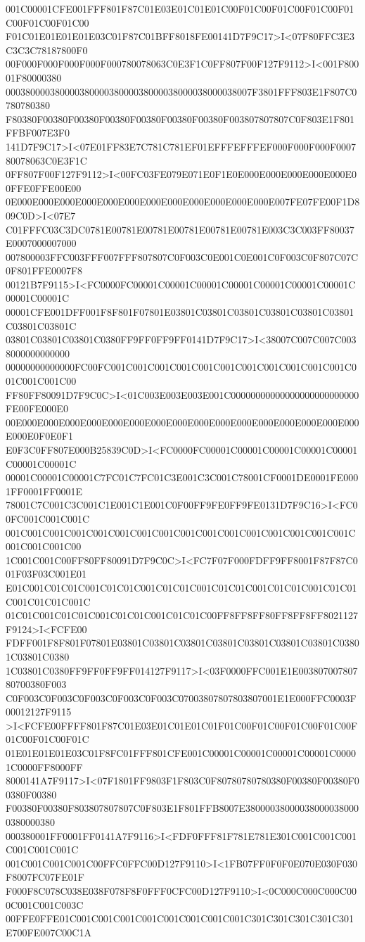 001C00001CFE001FFF801F87C01E03E01C01E01C00F01C00F01C00F01C00F01C00F01C00F01C00
F01C01E01E01E01E03C01F87C01BFF8018FE00141D7F9C17>I<07F80FFC3E3C3C3C78187800F0
00F000F000F000F000F000780078063C0E3F1C0FF807F00F127F9112>I<001F80001F80000380
00038000038000038000038000038000038000038000038007F3801FFF803E1F807C0780780380
F80380F00380F00380F00380F00380F00380F00380F003807807807C0F803E1F801FFBF007E3F0
141D7F9C17>I<07E01FF83E7C781C781EF01EFFFEFFFEF000F000F000F000780078063C0E3F1C
0FF807F00F127F9112>I<00FC03FE079E071E0F1E0E000E000E000E000E000E00FFE0FFE00E00
0E000E000E000E000E000E000E000E000E000E000E000E000E007FE07FE00F1D809C0D>I<07E7
C01FFFC03C3DC0781E00781E00781E00781E00781E00781E003C3C003FF80037E0007000007000
007800003FFC003FFF007FFF807807C0F003C0E001C0E001C0F003C0F807C07C0F801FFE0007F8
00121B7F9115>I<FC0000FC00001C00001C00001C00001C00001C00001C00001C00001C00001C
00001CFE001DFF001F8F801F07801E03801C03801C03801C03801C03801C03801C03801C03801C
03801C03801C03801C0380FF9FF0FF9FF0141D7F9C17>I<38007C007C007C0038000000000000
00000000000000FC00FC001C001C001C001C001C001C001C001C001C001C001C001C001C001C00
FF80FF80091D7F9C0C>I<01C003E003E003E001C00000000000000000000000000FE00FE000E0
00E000E000E000E000E000E000E000E000E000E000E000E000E000E000E000E000E000E0F0E0F1
E0F3C0FF807E000B25839C0D>I<FC0000FC00001C00001C00001C00001C00001C00001C00001C
00001C00001C00001C7FC01C7FC01C3E001C3C001C78001CF0001DE0001FE0001FF0001FF0001E
78001C7C001C3C001C1E001C1E001C0F00FF9FE0FF9FE0131D7F9C16>I<FC00FC001C001C001C
001C001C001C001C001C001C001C001C001C001C001C001C001C001C001C001C001C001C001C00
1C001C001C00FF80FF80091D7F9C0C>I<FC7F07F000FDFF9FF8001F87F87C001F03F03C001E01
E01C001C01C01C001C01C01C001C01C01C001C01C01C001C01C01C001C01C01C001C01C01C001C
01C01C001C01C01C001C01C01C001C01C01C00FF8FF8FF80FF8FF8FF8021127F9124>I<FCFE00
FDFF001F8F801F07801E03801C03801C03801C03801C03801C03801C03801C03801C03801C0380
1C03801C0380FF9FF0FF9FF014127F9117>I<03F0000FFC001E1E00380700780780700380F003
C0F003C0F003C0F003C0F003C0F003C07003807807803807001E1E000FFC0003F00012127F9115
>I<FCFE00FFFF801F87C01E03E01C01E01C01F01C00F01C00F01C00F01C00F01C00F01C00F01C
01E01E01E01E03C01F8FC01FFF801CFE001C00001C00001C00001C00001C00001C0000FF8000FF
8000141A7F9117>I<07F1801FF9803F1F803C0F80780780780380F00380F00380F00380F00380
F00380F00380F803807807807C0F803E1F801FFB8007E380000380000380000380000380000380
000380001FF0001FF0141A7F9116>I<FDF0FFF81F781E781E301C001C001C001C001C001C001C
001C001C001C001C00FFC0FFC00D127F9110>I<1FB07FF0F0F0E070E030F030F8007FC07FE01F
F000F8C078C038E038F078F8F0FFF0CFC00D127F9110>I<0C000C000C000C000C001C001C003C
00FFE0FFE01C001C001C001C001C001C001C001C001C301C301C301C301C301E700FE007C00C1A
